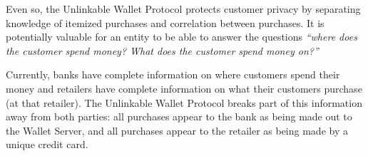 Even so, the Unlinkable Wallet Protocol protects customer privacy
    by separating knowledge of itemized purchases and correlation between purchases.
It is potentially valuable for an entity to be able to answer the questions \emph{``where does the customer spend money? What does the customer spend money on?''}

Currently, banks have complete information on where customers spend their money
    and retailers have complete information on what their customers purchase (at that retailer).
The Unlinkable Wallet Protocol breaks part of this information away from both parties:
    all purchases appear to the bank as being made out to the Wallet Server, and
    all purchases appear to the retailer as being made by a unique credit card.

